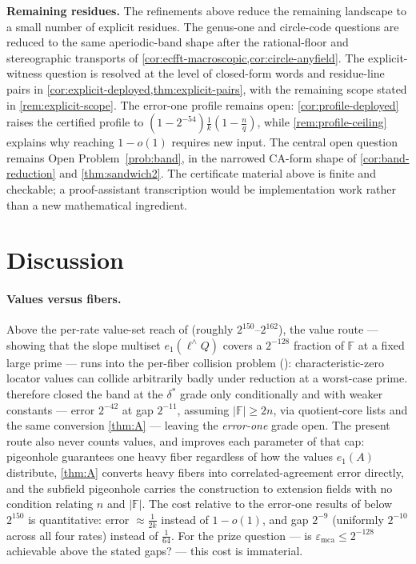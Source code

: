 \documentclass[11pt]{article}
\theoremstyle{definition}
\theoremstyle{remark}
\newcommand{\F}{\mathbb{F}}
\newcommand{\emca}{\varepsilon_{\mathrm{mca}}}
\newcommand{\eone}{e_1}
\begin{document}
\medskip
\noindent\textbf{Remaining residues.}
The refinements above reduce the remaining landscape to a small number of explicit residues.  The genus-one and circle-code questions are reduced to the same aperiodic-band shape after the rational-floor and stereographic transports of \cref{cor:ecfft-macroscopic,cor:circle-anyfield}.  The explicit-witness question is resolved at the level of closed-form words and residue-line pairs in \cref{cor:explicit-deployed,thm:explicit-pairs}, with the remaining scope stated in \cref{rem:explicit-scope}.  The error-one profile remains open: \cref{cor:profile-deployed} raises the certified profile to $(1-2^{-54})\frac1k(1-\frac nq)$, while \cref{rem:profile-ceiling} explains why reaching $1-o(1)$ requires new input.  The central open question remains Open Problem~\ref{prob:band}, in the narrowed CA-form shape of \cref{cor:band-reduction} and \cref{thm:sandwich2}.  The certificate material above is finite and checkable; a proof-assistant transcription would be implementation work rather than a new mathematical ingredient.


\section{Discussion}\label{sec:discussion}

\paragraph{Values versus fibers.}
Above the per-rate value-set reach of \cite{Cho26b} (roughly $2^{150}$--$2^{162}$), the value route --- showing that the slope multiset $\eone(\ell^\wedge Q)$ covers a $2^{-128}$ fraction of $\F$ at a fixed large prime --- runs into the per-fiber collision problem (\cite[Rem.\ ``The remaining band'']{Cho26b}): characteristic-zero locator values can collide arbitrarily badly under reduction at a worst-case prime. \cite{Cho26b} therefore closed the band at the $\delta^*$ grade only conditionally and with weaker constants --- error $2^{-42}$ at gap $2^{-11}$, assuming $|\F|\ge2n$, via quotient-core lists and the same conversion \cref{thm:A} --- leaving the \emph{error-one} grade open. The present route also never counts values, and improves each parameter of that cap: pigeonhole guarantees one heavy fiber regardless of how the values $\eone(A)$ distribute, \cref{thm:A} converts heavy fibers into correlated-agreement error directly, and the subfield pigeonhole carries the construction to extension fields with no condition relating $n$ and $|\F|$. The cost relative to the error-one results of \cite{Cho26a,Cho26b} below $2^{150}$ is quantitative: error $\approx\frac1{2k}$ instead of $1-o(1)$, and gap $2^{-9}$ (uniformly $2^{-10}$ across all four rates) instead of $\frac1{64}$. For the prize question --- is $\emca\le2^{-128}$ achievable above the stated gaps? --- this cost is immaterial.
\end{document}
